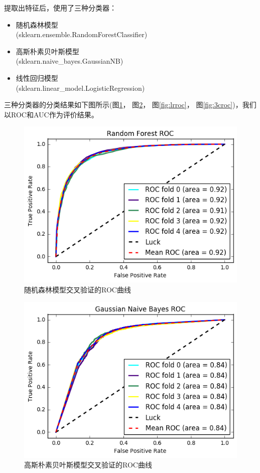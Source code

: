 提取出特征后，使用了三种分类器：
\begin{itemize}
	\item
	  随机森林模型  \\
	  (sklearn.ensemble.RandomForestClassifier)
	\item
	  高斯朴素贝叶斯模型  \\
	  (sklearn.naive\_bayes.GaussianNB)
	\item
	  线性回归模型  \\
	  (sklearn.linear\_model.LogisticRegression)
\end{itemize}
三种分类器的分类结果如下图所示(图\ref{fig:rfroc}， 图\ref{fig:gnbroc}， 图\ref{fig:lrroc}， 图\ref{fig:3croc})，我们以ROC和AUC作为评价结果。
\begin{figure}[h]
\centering
\includegraphics[width=0.9\linewidth]{rf_roc}
\caption[rf_roc]{随机森林模型交叉验证的ROC曲线}
\label{fig:rfroc}
\end{figure}

\begin{figure}[p]
\centering
\includegraphics[width=0.9\linewidth]{gnb_roc}
\caption[gnb_roc]{高斯朴素贝叶斯模型交叉验证的ROC曲线}
\label{fig:gnbroc}
\end{figure}

